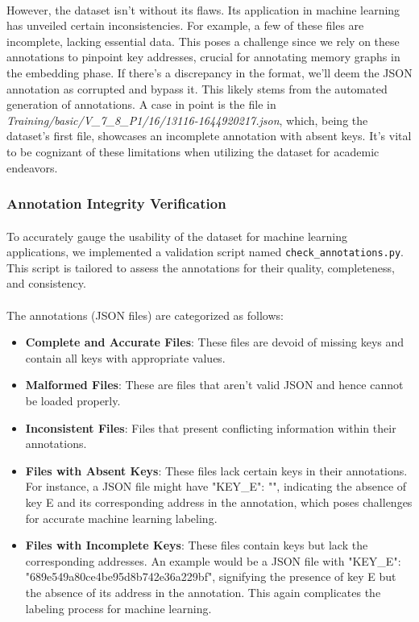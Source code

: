         \paragraph{}However, the dataset isn't without its flaws. Its application in machine learning has unveiled certain inconsistencies. For example, a few of these files are incomplete, lacking essential data. This poses a challenge since we rely on these annotations to pinpoint key addresses, crucial for annotating memory graphs in the embedding phase. If there's a discrepancy in the format, we'll deem the JSON annotation as corrupted and bypass it. This likely stems from the automated generation of annotations. A case in point is the file in \textit{Training/basic/V\_7\_8\_P1/16/13116-1644920217.json}, which, being the dataset's first file, showcases an incomplete annotation with absent keys. It's vital to be cognizant of these limitations when utilizing the dataset for academic endeavors.
        
        \subsubsection{Annotation Integrity Verification}
            \paragraph{}To accurately gauge the usability of the dataset for machine learning applications, we implemented a validation script named \texttt{check\_annotations.py}. This script is tailored to assess the annotations for their quality, completeness, and consistency.

            \paragraph{}The annotations (JSON files) are categorized as follows:
            \begin{itemize}
                \item \textbf{Complete and Accurate Files}: These files are devoid of missing keys and contain all keys with appropriate values.
                \item \textbf{Malformed Files}: These are files that aren't valid JSON and hence cannot be loaded properly.
                \item \textbf{Inconsistent Files}: Files that present conflicting information within their annotations.
                \item \textbf{Files with Absent Keys}: These files lack certain keys in their annotations. For instance, a JSON file might have "KEY\_E": "", indicating the absence of key E and its corresponding address in the annotation, which poses challenges for accurate machine learning labeling.
                \item \textbf{Files with Incomplete Keys}: These files contain keys but lack the corresponding addresses. An example would be a JSON file with "KEY\_E": "689e549a80ce4be95d8b742e36a229bf", signifying the presence of key E but the absence of its address in the annotation. This again complicates the labeling process for machine learning.
            \end{itemize}

